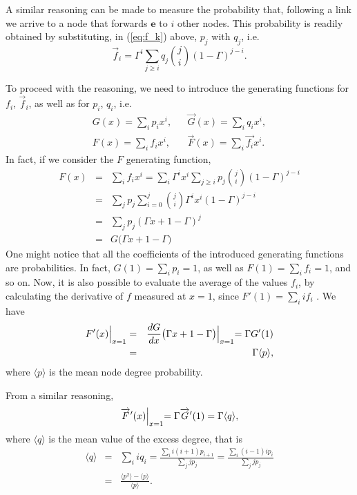 \documentclass[10pt, conference, compsocconf]{IEEEtran}
\begin{document}
A similar reasoning can be made to measure the probability that, following a link we arrive to a node that forwards $\mathbf{e}$ to $i$ other nodes. This probability is readily obtained by substituting, in (\ref{eq:f_k}) above, $p_j$ with $q_j$, i.e.
\begin{equation}\label{eq:g_k}
  \overrightarrow{f}_i = \Gamma^i \sum_{j \geq i} q_j \binom{j}{i} (1 - \Gamma)^{j-i}.
\end{equation}


To proceed with the reasoning, we need to introduce the generating functions for $f_i$, $\overrightarrow{f}_i$, as well as for $p_i$, $q_i$, i.e.
\begin{eqnarray}\label{eq:F_G} 
  G(x) = \sum_i p_i x^i, & & \overrightarrow{G}(x) = \sum_i q_i x^i, \\
F(x) = \sum_i f_i x^i, & & \overrightarrow{F}(x) = \sum_i \overrightarrow{f_i} x^i.
\end{eqnarray}
In fact, if we consider the $F$ generating function, 
\begin{eqnarray}\label{eq:F_calcolo} 
  F(x) & = & \sum_i f_i x^i 
     =  \sum_i \Gamma^i x^i 
              \sum_{j \geq i} p_j \binom{j}{i} (1 - \Gamma)^{j-i}\nonumber \\
  & = & \sum_j p_j \sum_{i =0}^j \binom{j}{i}  \Gamma^i x^i (1 - \Gamma)^{j-i}\nonumber \\
   & = & \sum_j p_j (\Gamma x + 1 - \Gamma)^j\nonumber \\
  & = & G\big(\Gamma x + 1 - \Gamma\big)
\end{eqnarray}
One might notice that all the coefficients of the introduced generating functions are probabilities. In fact, $G(1) = \sum_i p_i = 1$, as well as $F(1) = \sum_i f_i = 1$, and so on.
Now, it is also possible to evaluate the average of the values $f_i$, by calculating the derivative of $f$ measured at $x=1$, since $F'(1) = \sum_i i f_i$ \cite{Wilf_1994}.
We have
\begin{eqnarray}\label{eq:F'(1)} 
  F'(x)\Bigl\lvert_{x=1} & = & \frac{dG}{dx}\big(\Gamma x + 1 - \Gamma\big)\Bigl\lvert_{x=1} 
                         =  \Gamma G'(1)\nonumber \\ 
                        & = & \Gamma \langle p \rangle,
\end{eqnarray}
where $\langle p \rangle$ is the mean node degree probability.

From a similar reasoning,
\begin{eqnarray}\label{eq:F_over'(1)} 
  \overrightarrow{F}'(x)\Bigl\lvert_{x=1}
  = \Gamma \overrightarrow{G}'(1) = \Gamma \langle q \rangle,
\end{eqnarray}
where $\langle q \rangle$ is the mean value of the excess degree, that is \cite{newmanHandbook}
\begin{eqnarray}\label{eq:mean_q} 
  \langle q \rangle & = & \sum_i i q_i = \frac{\sum_i i (i+1) p_{i+1}}{\sum_j j p_j}
   =  \frac{\sum_i (i-1) i p_i}{\sum_j j p_j} \nonumber \\
  & = & \frac{\langle p^2 \rangle - \langle p \rangle}{\langle p \rangle}.
\end{eqnarray}
\end{document}
